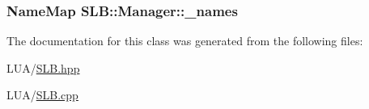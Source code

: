 \subsubsection[{\texorpdfstring{\+\_\+names}{_names}}]{\setlength{\rightskip}{0pt plus 5cm}Name\+Map S\+L\+B\+::\+Manager\+::\+\_\+names\hspace{0.3cm}{\ttfamily [private]}}\hypertarget{classSLB_1_1Manager_a962ea3cb7cef0e36dd972b0b47a89a38}{}\label{classSLB_1_1Manager_a962ea3cb7cef0e36dd972b0b47a89a38}


The documentation for this class was generated from the following files\+:\begin{DoxyCompactItemize}
\item 
L\+U\+A/\hyperlink{SLB_8hpp}{S\+L\+B.\+hpp}\item 
L\+U\+A/\hyperlink{SLB_8cpp}{S\+L\+B.\+cpp}\end{DoxyCompactItemize}
